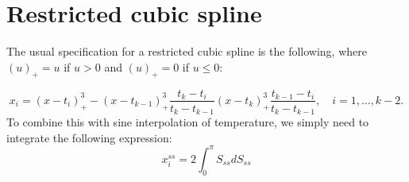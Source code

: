 \documentclass[12pt]{article}
\title{}
\author{}
\begin{document}
\maketitle

\begin{abstract}

\end{abstract}

\section{Restricted cubic spline}
The usual specification for a restricted cubic spline is the following, where $(u)_{+} = u$ if $u > 0$  and $(u)_{+} = 0$ if $u \leq 0$:

\begin{equation}\label{eq:cubic_spline_standard}
x_{i} = (x - t_{i})^3_{+} - (x - t_{k-1})^3_{+}\dfrac{t_{k} - t_{i}}{t_{k} - t_{k-1}}  (x - t_{k})^3_{+}\dfrac{t_{k - 1} - t_{i}}{t_{k} - t_{k - 1}}, \quad i = 1, \dots, k - 2.
\end{equation}
To combine this with sine interpolation of temperature, we simply need to integrate the following expression:
\begin{equation}\label{eq:cubic_spline_sine_interpolation}
x_{i}^{ss} = 2\int_{0}^{\pi}S_{ss} dS_{ss}
\end{equation}
\end{document}
